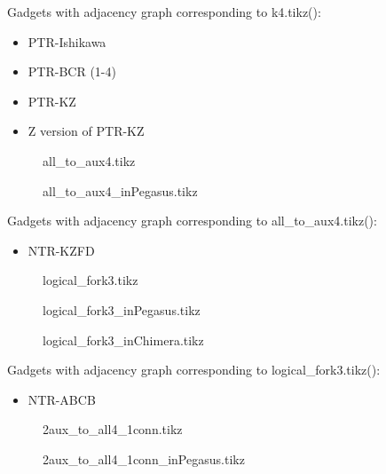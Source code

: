 \documentclass{article}
\begin{document}
Gadgets with adjacency graph corresponding to k4.tikz(\scalebox{.25}{}):

\begin{itemize}
\item PTR-Ishikawa
\item PTR-BCR (1-4)
\item PTR-KZ
\item Z version of PTR-KZ 
\end{itemize}

\begin{figure}

\caption{all\_to\_aux4.tikz}
\end{figure}

\begin{figure}

\caption{all\_to\_aux4\_inPegasus.tikz}
\end{figure}

Gadgets with adjacency graph corresponding to all\_to\_aux4.tikz(\scalebox{.25}{}):

\begin{itemize}
\item NTR-KZFD 
\end{itemize}

\begin{figure}

\caption{logical\_fork3.tikz}
\end{figure}


\begin{figure}

\caption{logical\_fork3\_inPegasus.tikz}
\end{figure}

\begin{figure}

\caption{logical\_fork3\_inChimera.tikz}
\end{figure}

Gadgets with adjacency graph corresponding to logical\_fork3.tikz(\scalebox{.25}{}):

\begin{itemize}
\item NTR-ABCB
\end{itemize}

\begin{figure}

\caption{2aux\_to\_all4\_1conn.tikz}
\end{figure}

\begin{figure}

\caption{2aux\_to\_all4\_1conn\_inPegasus.tikz}
\end{figure}
\end{document}
